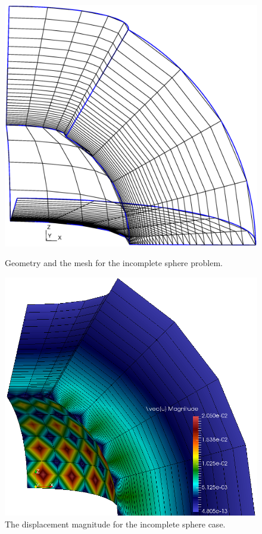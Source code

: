 \documentclass[letter,12pt]{article}
\begin{document}
\begin{figure}
  \centering
  \includegraphics[width=.6\linewidth,center]{sphere-mesh.eps}
  \caption{Geometry and the mesh for the incomplete sphere problem.}
  \label{fig:sphere-mesh}
  \vspace{0.5cm}
  \includegraphics[width=.6\linewidth,center]{sphere-3d-2.png}
  \caption{The displacement magnitude for the incomplete sphere case.}
  \label{fig:sphere-u}
\end{figure}
\end{document}
